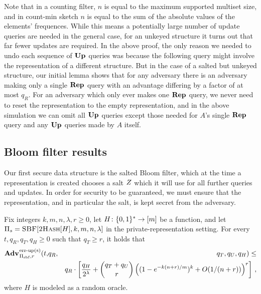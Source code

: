 Note that in a counting filter, $n$ is equal to the maximum supported multiset size, and in count-min sketch $n$ is equal to the sum of the absolute values of the elements' frequences. While this means a potentially large number of update queries are needed in the general case, for an unkeyed structure it turns out that far fewer updates are required. In the above proof, the only reason we needed to undo each sequence of $\mathbf{Up}\hspace{0.5pt}$ queries was because the following query might involve the representation of a different structure. But in the case of a salted but unkeyed structure, our initial lemma shows that for any adversary there is an adversary making only a single $\mathbf{Rep}\hspace{0.5pt}$ query with an advantage differing by a factor of at most $q_R$. For an adversary which only ever makes one $\mathbf{Rep}\hspace{0.5pt}$ query, we never need to reset the representation to the empty representation, and in the above simulation we can omit all $\mathbf{Up}\hspace{0.5pt}$ queries except those needed for $A$'s single $\mathbf{Rep}\hspace{0.5pt}$ query and any $\mathbf{Up}\hspace{0.5pt}$ queries made by $A$ itself.



\subsection{Bloom filter results}
\label{subsec:bloom-filters}



Our first secure data structure is the salted Bloom filter, which at the time a representation is created chooses a salt $Z$ which it will use for all further queries and updates. In order for security to be guaranteed, we must ensure that the representation, and in particular the salt, is kept secret from the adversary.

\begin{theorem}\label{thm:bf-priv-salt-bound}
Fix integers $k, m, n, \lambda, r\geq 0$, let $H \colon \{0,1\}^* \to [m]$ be a function, and let $\mathrm{\Pi}_s = \textsc{SBF}[\textsc{2Hash}[H],k,m,n,\lambda]$ in the private-representation setting.
  For every $t, q_R, q_T, q_H \geq 0$ such that $q_T \geq r$, it holds that
  \begin{eqnarray*}
    \Adv{\erreps}_{\struct_\saltybloom,r}(t,&q_R,& q_T, q_U, q_H) \leq \\ && q_R \cdot
     \left[
      \frac{q_H}{2^\lambda} +
      {\dbinom{q_T+q_U}{r}} \left( (1-e^{-k(n+r)/m})^k + O(1/(n+r)) \right)^r
    \right] \,,
\end{eqnarray*}
where $H$ is modeled as a random oracle.
\end{theorem}

